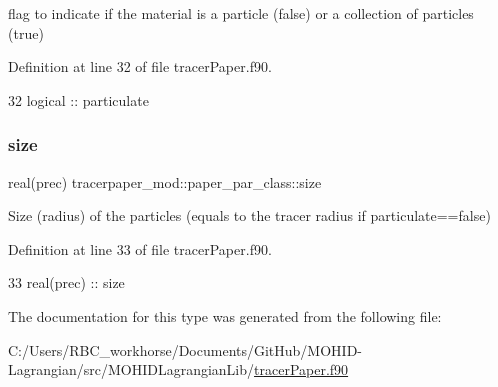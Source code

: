 flag to indicate if the material is a particle (false) or a collection of particles (true) 



Definition at line 32 of file tracer\+Paper.\+f90.


\begin{DoxyCode}
32         \textcolor{keywordtype}{logical}    :: particulate
\end{DoxyCode}
\mbox{\label{structtracerpaper__mod_1_1paper__par__class_a25325a2f6e0e3a16e1a2abffe5d0f6c8}} 
\subsubsection{\texorpdfstring{size}{size}}
{\footnotesize\ttfamily real(prec) tracerpaper\+\_\+mod\+::paper\+\_\+par\+\_\+class\+::size\hspace{0.3cm}{\ttfamily [private]}}



Size (radius) of the particles (equals to the tracer radius if particulate==false) 



Definition at line 33 of file tracer\+Paper.\+f90.


\begin{DoxyCode}
33         \textcolor{keywordtype}{real(prec)} :: size
\end{DoxyCode}


The documentation for this type was generated from the following file\+:\begin{DoxyCompactItemize}
\item 
C\+:/\+Users/\+R\+B\+C\+\_\+workhorse/\+Documents/\+Git\+Hub/\+M\+O\+H\+I\+D-\/\+Lagrangian/src/\+M\+O\+H\+I\+D\+Lagrangian\+Lib/\mbox{\hyperlink{tracer_paper_8f90}{tracer\+Paper.\+f90}}\end{DoxyCompactItemize}
